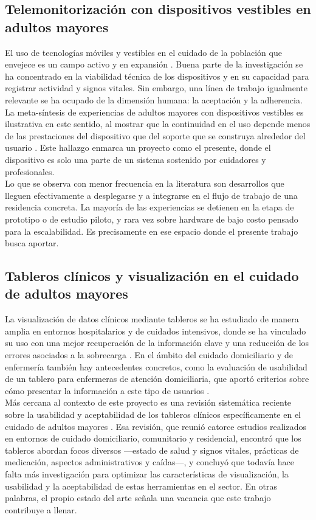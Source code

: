 \subsection{Telemonitorización con dispositivos vestibles en adultos mayores}
El uso de tecnologías móviles y vestibles en el cuidado de la población que envejece es un campo activo y en expansión \cite{malwade2018}. Buena parte de la investigación se ha concentrado en la viabilidad técnica de los dispositivos y en su capacidad para registrar actividad y signos vitales. Sin embargo, una línea de trabajo igualmente relevante se ha ocupado de la dimensión humana: la aceptación y la adherencia. La meta-síntesis de experiencias de adultos mayores con dispositivos vestibles es ilustrativa en este sentido, al mostrar que la continuidad en el uso depende menos de las prestaciones del dispositivo que del soporte que se construya alrededor del usuario \cite{moore2021}. Este hallazgo enmarca un proyecto como el presente, donde el dispositivo es solo una parte de un sistema sostenido por cuidadores y profesionales.\\

Lo que se observa con menor frecuencia en la literatura son desarrollos que lleguen efectivamente a desplegarse y a integrarse en el flujo de trabajo de una residencia concreta. La mayoría de las experiencias se detienen en la etapa de prototipo o de estudio piloto, y rara vez sobre hardware de bajo costo pensado para la escalabilidad. Es precisamente en ese espacio donde el presente trabajo busca aportar.\\


\subsection{Tableros clínicos y visualización en el cuidado de adultos mayores}
La visualización de datos clínicos mediante tableros se ha estudiado de manera amplia en entornos hospitalarios y de cuidados intensivos, donde se ha vinculado su uso con una mejor recuperación de la información clave y una reducción de los errores asociados a la sobrecarga \cite{khairat2018}. En el ámbito del cuidado domiciliario y de enfermería también hay antecedentes concretos, como la evaluación de usabilidad de un tablero para enfermeras de atención domiciliaria, que aportó criterios sobre cómo presentar la información a este tipo de usuarios \cite{dowding2019}.\\

Más cercana al contexto de este proyecto es una revisión sistemática reciente sobre la usabilidad y aceptabilidad de los tableros clínicos específicamente en el cuidado de adultos mayores \cite{siette2023}. Esa revisión, que reunió catorce estudios realizados en entornos de cuidado domiciliario, comunitario y residencial, encontró que los tableros abordan focos diversos —estado de salud y signos vitales, prácticas de medicación, aspectos administrativos y caídas—, y concluyó que todavía hace falta más investigación para optimizar las características de visualización, la usabilidad y la aceptabilidad de estas herramientas en el sector. En otras palabras, el propio estado del arte señala una vacancia que este trabajo contribuye a llenar.\\



